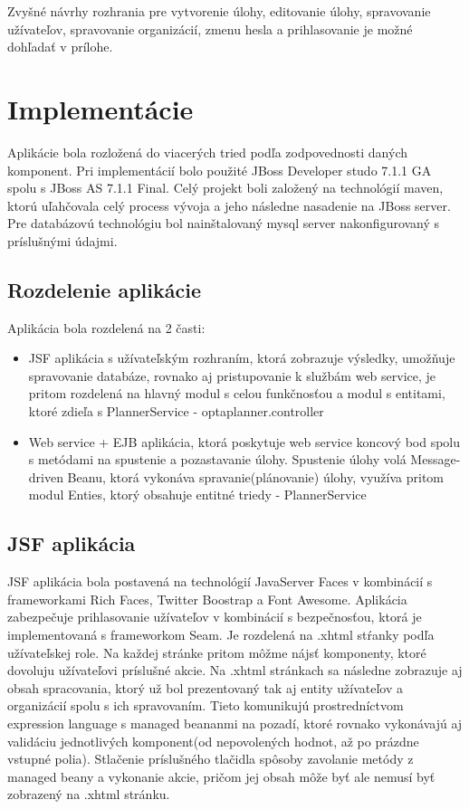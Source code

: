 Zvyšné návrhy rozhrania pre vytvorenie úlohy, editovanie úlohy, spravovanie užívateľov, spravovanie organizácií, zmenu hesla a prihlasovanie je možné dohľadať v prílohe.


\section{Implementácie}
Aplikácie bola rozložená do viacerých tried podľa zodpovednosti daných komponent. Pri implementácií bolo použité JBoss Developer studo 7.1.1 GA spolu s JBoss AS 7.1.1 Final. Celý projekt boli založený na technológií maven, ktorú uľahčovala celý process vývoja a jeho následne nasadenie na JBoss server. Pre databázovú technológiu bol nainštalovaný mysql server nakonfigurovaný s príslušnými údajmi.

\subsection{Rozdelenie aplikácie}

	Aplikácia bola rozdelená na 2 časti:
	\begin{itemize}
	\item JSF aplikácia s užívateľským rozhraním, ktorá zobrazuje výsledky, umožňuje spravovanie databáze, rovnako aj pristupovanie k službám web service, je pritom rozdelená na hlavný modul s celou funkčnosťou a modul s entitami, ktoré zdieľa s PlannerService - optaplanner.controller
	\item Web service + EJB aplikácia, ktorá poskytuje web service koncový bod spolu s metódami na spustenie a pozastavanie úlohy. Spustenie úlohy volá Message-driven Beanu, ktorá vykonáva spravanie(plánovanie) úlohy, využíva pritom modul Enties, ktorý obsahuje entitné triedy - PlannerService

	\end{itemize}




\subsection{JSF aplikácia}
JSF aplikácia bola postavená na technológií JavaServer Faces v kombinácií s frameworkami Rich Faces, Twitter Boostrap a Font Awesome.  Aplikácia zabezpečuje prihlasovanie užívateľov v kombinácií s bezpečnosťou, ktorá je implementovaná s frameworkom Seam. Je rozdelená na .xhtml stŕanky podľa užívateľskej role. Na každej stránke pritom môžme nájsť komponenty, ktoré dovoluju užívateľovi príslušné akcie. Na .xhtml stránkach sa následne zobrazuje aj obsah spracovania, ktorý už bol prezentovaný tak aj entity užívateľov a organizácií spolu s ich spravovaním. Tieto komunikujú prostredníctvom expression language s managed beananmi na pozadí, ktoré rovnako vykonávajú aj validáciu jednotlivých komponent(od nepovolených hodnot, až po prázdne vstupné polia). Stlačenie príslušného tlačidla spôsoby zavolanie metódy z managed beany a vykonanie akcie, pričom jej obsah môže byť ale nemusí byť zobrazený na .xhtml stránku.
	

